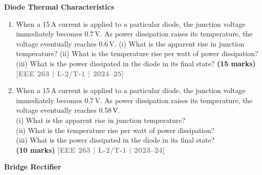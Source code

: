 \documentclass[12pt,a3paper]{article}
\newcommand{\yr}[1]{\hfill\textcolor{gray}{\small\textbf{[#1]}}}
\newcommand{\mk}[1]{\textcolor{orange!70!black}{\small\textbf{(#1 marks)}}}
\newcommand{\subtopic}[2]{%
  \vspace{10pt}
  \noindent\begin{tcolorbox}[colback=#1!8,colframe=#1,boxrule=0.6pt,arc=4pt,
    left=6pt,right=6pt,top=4pt,bottom=4pt]
    \small\bfseries\textcolor{#1}{#2}
  \end{tcolorbox}
  \vspace{2pt}
}
\begin{document}
\subtopic{cA}{Diode Thermal Characteristics}
\label{sub:s1-thermal}

\begin{enumerate}\item When a 15\,A current is applied to a particular diode, the junction voltage immediately becomes 0.7\,V. As power dissipation raises its temperature, the voltage eventually reaches 0.6\,V. (i) What is the apparent rise in junction temperature? (ii) What is the temperature rise per watt of power dissipation? (iii) What is the power dissipated in the diode in its final state?
\mk{15} \yr{EEE 263 | L-2/T-1 | 2024--25}

\item When a 15\,A current is applied to a particular diode, the junction voltage immediately becomes 0.7\,V. As power dissipation raises its temperature, the voltage eventually reaches 0.58\,V.\\
 (i) What is the apparent rise in junction temperature? \\
 (ii) What is the temperature rise per watt of power dissipation? \\
 (iii) What is the power dissipated in the diode in its final state?\\
\mk{10} \yr{EEE 263 | L-2/T-1 | 2023--24}

\end{enumerate}

\subtopic{cA}{Bridge Rectifier}
\label{sub:s1-rectifier}
\end{document}
